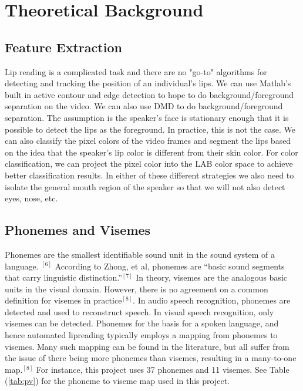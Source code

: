 \documentclass[a4paper]{article}
\begin{document}
\section{Theoretical Background}
\label{sec:theory}
\subsection{Feature Extraction}
Lip reading is a complicated task and there are no "go-to" algorithms for detecting and tracking the position of an individual's lips. We can use Matlab's built in active contour and edge detection to hope to do background/foreground separation on the video. We can also use DMD to do background/foreground separation. The assumption is the speaker's face is stationary enough that it is possible to detect the lips as the foreground. In practice, this is not the case. We can also classify the pixel colors of the video frames and segment the lips based on the idea that the speaker's lip color is different from their skin color. For color classification, we can project the pixel color into the LAB color space to achieve better classification results. In either of these different strategies we also need to isolate the general mouth region of the speaker so that we will not also detect eyes, nose, etc.
\subsection{Phonemes and Visemes}
Phonemes are the smallest identifiable sound unit in the sound system of a language. $^{[6]}$  According to Zhong, et al, phonemes are ``basic sound segments that carry linguistic distinction.''$^{[7]}$ In theory, visemes are the analogous basic units in the visual domain.  However, there is no agreement on a common definition for visemes in practice$^{[8]}$.  In audio speech recognition, phonemes are detected and used to reconstruct speech.  In visual speech recognition, only visemes can be detected.  Phonemes for the basis for a spoken language, and hence automated lipreading typically employs a mapping from phonemes to visemes.  Many such mapping can be found in the literature, but all suffer from the issue of there being more phonemes than visemes, resulting in a many-to-one map.$^{[8]}$  For instance, this project uses 37 phonemes and 11 visemes. See Table (\ref{tab:pv}) for the phoneme to viseme map used in this project.  
\end{document}

